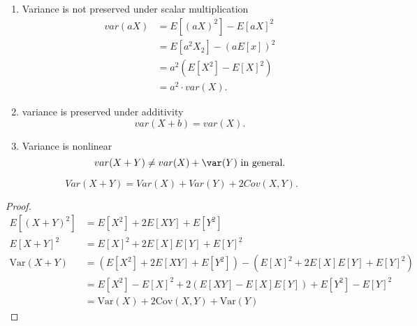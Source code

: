 \documentclass[a4paper]{article}
\begin{document}
\begin{prop}
  \begin{enumerate}
    \item Variance is not preserved under scalar multiplication \begin{align*}
    var(aX) &= E[(aX)^2] - E[aX]^2 \\ 
            &= E[a^2 X_2] - (aE[x])^2 \\
            &= a^2 (E[X^2] - E[X]^2) \\
            &= a^2 \cdot var(X)
  .\end{align*}
    \item variance is preserved under additivity \[
  var(X + b) = var(X)
  .\] 

    \item Variance is nonlinear  \[
    var(X + Y) \neq var(X) + \var(Y) \text{ in general}
  .\]  
  \end{enumerate}
\end{prop}

\begin{lemma}
  \[
  Var(X + Y) = Var(X) + Var(Y) + 2Cov(X,Y)
  .\] 
\end{lemma}

\begin{proof}
\begin{align*}
  E[(X + Y)^2] &= E[X^2] + 2E[XY] + E[Y^2] \\
  E[X+Y]^2 &= E[X]^2 + 2E[X]E[Y] + E[Y]^2 \\
  \text{Var}(X + Y) &= (E[X^2] + 2E[XY] + E[Y^2]) - (E[X]^2 + 2E[X]E[Y] + E[Y]^2) \\
  &= E[X^2] - E[X]^2 + 2(E[XY] - E[X]E[Y]) + E[Y^2] - E[Y]^2 \\
  &= \text{Var}(X) + 2\text{Cov}(X,Y) + \text{Var}(Y)
\end{align*}
\end{proof}
\end{document}
